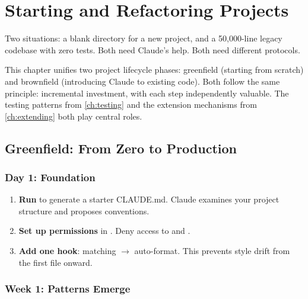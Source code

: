 \chapter{Starting and Refactoring Projects}
\label{ch:projects}

\begin{itshape}
Two situations: a blank directory for a new project,
and a 50,000-line legacy codebase with zero tests.
Both need Claude's help. Both need different protocols.
\end{itshape}

This chapter unifies two project lifecycle phases:
greenfield (starting from scratch) and brownfield (introducing Claude
to existing code). Both follow the same principle:
incremental investment, with each step independently valuable.
The testing patterns from \cref{ch:testing} and the extension mechanisms
from \cref{ch:extending} both play central roles.

\section{Greenfield: From Zero to Production}
\label{sec:greenfield}

\subsection{Day 1: Foundation}


\begin{enumerate}
  \item \textbf{Run } to generate a starter CLAUDE.md.
    Claude examines your project structure and proposes conventions.
  \item \textbf{Set up permissions} in .
    Deny access to  and .
  \item \textbf{Add one hook}:  matching 
    $\rightarrow$ auto-format. This prevents style drift from the first file onward.
\end{enumerate}

\subsection{Week 1: Patterns Emerge}


